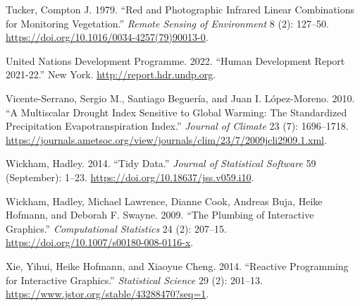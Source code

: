 \documentclass[
  letterpaper,
  DIV=11,
  numbers=noendperiod]{scrartcl}
\newlength{\cslhangindent}
\newlength{\cslentryspacingunit} %
\newenvironment{CSLReferences}[2] %
 {%
  \setlength{\parindent}{0pt}
  \ifodd #1
  \let\oldpar\par
  \def\par{\hangindent=\cslhangindent\oldpar}
  \fi
  \setlength{\parskip}{#2\cslentryspacingunit}
 }%
 {}
\begin{document}
\begin{CSLReferences}{1}{0}
\leavevmode{}%
Tucker, Compton J. 1979. {``Red and Photographic Infrared Linear
Combinations for Monitoring Vegetation.''} \emph{Remote Sensing of
Environment} 8 (2): 127--50.
\url{https://doi.org/10.1016/0034-4257(79)90013-0}.

\leavevmode{}%
United Nations Development Programme. 2022. {``Human Development Report
2021-22.''} New York. \url{http://report.hdr.undp.org}.

\leavevmode{}%
Vicente-Serrano, Sergio M., Santiago Beguería, and Juan I. López-Moreno.
2010. {``A {Multiscalar} {Drought} {Index} {Sensitive} to {Global}
{Warming}: {The} {Standardized} {Precipitation} {Evapotranspiration}
{Index}.''} \emph{Journal of Climate} 23 (7): 1696--1718.
\url{https://journals.ametsoc.org/view/journals/clim/23/7/2009jcli2909.1.xml}.

\leavevmode{}%
Wickham, Hadley. 2014. {``Tidy {Data}.''} \emph{Journal of Statistical
Software} 59 (September): 1--23.
\url{https://doi.org/10.18637/jss.v059.i10}.

\leavevmode{}%
Wickham, Hadley, Michael Lawrence, Dianne Cook, Andreas Buja, Heike
Hofmann, and Deborah F. Swayne. 2009. {``The Plumbing of Interactive
Graphics.''} \emph{Computational Statistics} 24 (2): 207--15.
\url{https://doi.org/10.1007/s00180-008-0116-x}.

\leavevmode{}%
Xie, Yihui, Heike Hofmann, and Xiaoyue Cheng. 2014. {``Reactive
{Programming} for {Interactive} {Graphics}.''} \emph{Statistical
Science} 29 (2): 201--13.
\url{https://www.jstor.org/stable/43288470?seq=1}.

\end{CSLReferences}
\end{document}
